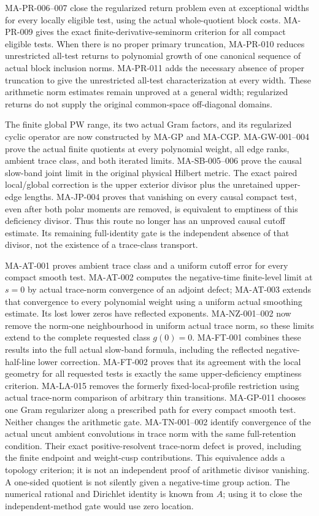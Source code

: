 \documentclass[11pt,a4paper]{article}
\begin{document}
MA-PR-006--007 close the regularized return problem even at
exceptional widths for every locally eligible test, using the
actual whole-quotient block costs. MA-PR-009 gives the exact
finite-derivative-seminorm criterion for all compact eligible
tests. When there is no proper primary truncation, MA-PR-010
reduces unrestricted all-test returns to polynomial growth of
one canonical sequence of actual block inclusion norms.
MA-PR-011 adds the necessary absence of proper truncation to give
the unrestricted all-test characterization at every width.
These arithmetic norm estimates remain unproved at a general
width; regularized returns do not supply the original
common-space off-diagonal domains.

The finite global PW range, its two actual Gram factors, and its
regularized cyclic operator are now constructed by MA-GP and
MA-CGP. MA-GW-001--004 prove the actual finite quotients at every
polynomial weight, all edge ranks, ambient trace class, and both
iterated limits. MA-SB-005--006 prove the causal slow-band joint
limit in the original physical Hilbert metric. The exact paired
local/global correction is the upper exterior divisor plus the
unretained upper-edge lengths. MA-JP-004 proves that vanishing
on every causal compact test, even after both polar moments are
removed, is equivalent to emptiness of this deficiency divisor.
Thus this route no longer has an unproved causal cutoff estimate.
Its remaining full-identity gate is the independent absence of
that divisor, not the existence of a trace-class transport.

MA-AT-001 proves ambient trace class and a uniform cutoff error
for every compact smooth test. MA-AT-002 computes the negative-time
finite-level limit at $s=0$ by actual trace-norm convergence of
an adjoint defect; MA-AT-003 extends that convergence to every
polynomial weight using a uniform actual smoothing estimate.
Its lost lower zeros have reflected exponents. MA-NZ-001--002
now remove the norm-one neighbourhood in uniform actual trace norm,
so these limits extend to the complete requested class $g(0)=0$.
MA-FT-001 combines these results into the full actual slow-band
formula, including the reflected negative-half-line lower correction.
MA-FT-002 proves that its agreement with the local geometry for all
requested tests is exactly the same upper-deficiency emptiness criterion.
MA-LA-015 removes the formerly fixed-local-profile restriction
using actual trace-norm comparison of arbitrary thin transitions.
MA-GP-011 chooses one Gram regularizer along a prescribed path
for every compact smooth test. Neither changes the arithmetic gate.
MA-TN-001--002 identify convergence of the actual uncut ambient
convolutions in trace norm with the same full-retention condition.
Their exact positive-resolvent trace-norm defect is proved,
including the finite endpoint and weight-cusp contributions.
This equivalence adds a topology criterion; it is not an
independent proof of arithmetic divisor vanishing.
A one-sided quotient is not silently given a negative-time group action.
The numerical rational and Dirichlet identity is known from $A$;
using it to close the independent-method gate would use zero location.
\end{document}
